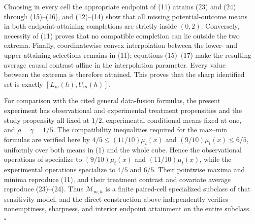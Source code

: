 Choosing in every cell the appropriate endpoint of (11) attains (23)
and (24) through (15)--(16), and (12)--(14) show that all missing
potential-outcome means in both endpoint-attaining completions are
strictly inside \((0,2)\).  Conversely, necessity of (11) proves that
no compatible completion can lie outside the two extrema.  Finally,
coordinatewise convex interpolation between the lower- and
upper-attaining selections remains in (11); equations (15)--(17) make
the resulting average causal contrast affine in the interpolation
parameter.  Every value between the extrema is therefore attained.
This proves that the sharp identified set is exactly
\([L_m(h),U_m(h)]\).

For comparison with the cited general data-fusion formulas, the present
experiment has observational and experimental treatment propensities
and the study propensity all fixed at \(1/2\), experimental conditional
means fixed at one, and \(\rho=\gamma=1/5\).  The compatibility
inequalities required for the max--min formulas are verified here by
\(4/5\leq(11/10)\mu_t(x)\) and
\((9/10)\mu_t(x)\leq6/5\), uniformly over both means in (1) and the
whole cube.  Hence the observational operations of
\cite[Lemma~1 and Theorem~1]{LannersRudinVolfovskyParikh2025}
specialize to \((9/10)\mu_t(x)\) and
\((11/10)\mu_t(x)\), while the experimental operations specialize to
\(4/5\) and \(6/5\).  Their pointwise maxima and minima reproduce
(11), and their treatment contrast and covariate average reproduce
(23)--(24).  Thus \(\mathcal M_{m,h}\) is a finite paired-cell
specialized subclass of that sensitivity model, and the direct
construction above independently verifies nonemptiness, sharpness, and
interior endpoint attainment on the entire subclass. \(\square\)
